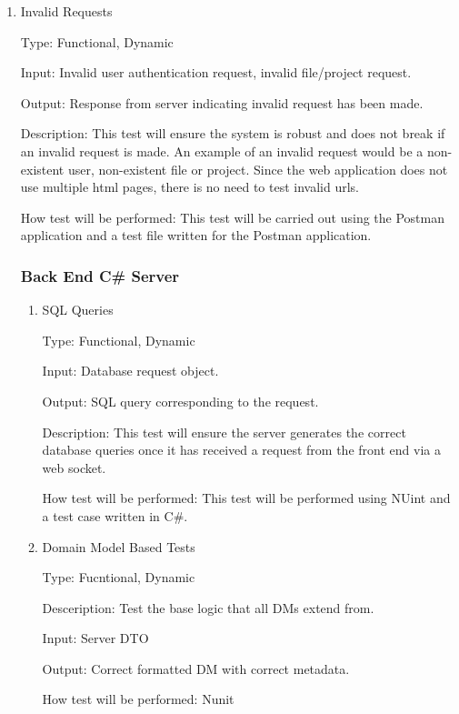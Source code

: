 \documentclass[12pt, titlepage]{article}
\begin{document}
\begin{enumerate}

\item{Invalid Requests\\}

Type: Functional, Dynamic

Input: Invalid user authentication request, invalid file/project request.

Output: Response from server indicating invalid request has been made.
					
Description: This test will ensure the system is robust and does not break
if an invalid request is made. An example of an invalid request would be a
non-existent user, non-existent file or project. Since the web application
does not use multiple html pages, there is no need to test invalid urls.

How test will be performed: This test will be carried out using the Postman
application and a test file written for the Postman application.

\subsubsection{Back End C\# Server}

\begin{enumerate}

\item{SQL Queries\\}

Type: Functional, Dynamic

Input: Database request object.

Output: SQL query corresponding to the request.
					
Description: This test will ensure the server generates the correct database
queries once it has received a request from the front end via a web socket.

How test will be performed: This test will be performed using NUint and a test
case written in C\#.

\item{Domain Model Based Tests\\}

Type: Fucntional, Dynamic

Desceription: Test the base logic that all DMs extend from.

Input: Server DTO

Output: Correct formatted DM with correct metadata.

How test will be performed: Nunit


\end{enumerate}
\end{enumerate}
\end{document}
